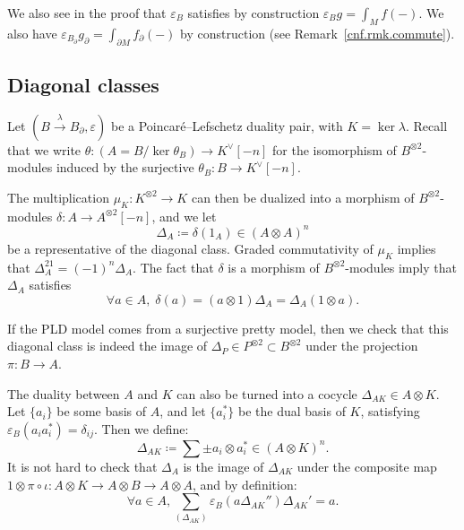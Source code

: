 We also see in the proof that $\varepsilon_{B}$ satisfies by construction $\varepsilon_{B} g = \int_{M} f(-)$.
We also have $\varepsilon_{B_{\partial}} g_{\partial} = \int_{\partial M} f_{\partial}(-)$ by construction (see Remark~\ref{cnf.rmk.commute}).

\subsection{Diagonal classes}
\label{cnfbnd.sec.diagonal-classes}

Let $(B \xrightarrow{\lambda} B_{\partial}, \varepsilon)$ be a Poincaré--Lefschetz duality pair, with $K = \ker \lambda$.
Recall that we write $\theta : (A = B / \ker \theta_{B}) \to K^{\vee}[-n]$ for the isomorphism of $B^{\otimes 2}$-modules induced by the surjective $\theta_{B} : B \to K^{\vee}[-n]$.

The multiplication $\mu_{K} : K^{\otimes 2} \to K$ can then be dualized into a morphism of $B^{\otimes 2}$-modules $\delta : A \to A^{\otimes 2}[-n]$, and we let
\begin{equation}
  \Delta_{A} \coloneqq \delta(1_{A}) \in (A \otimes A)^{n}
\end{equation}
be a representative of the diagonal class.
Graded commutativity of $\mu_{K}$ implies that $\Delta_{A}^{21} = (-1)^{n} \Delta_{A}$.
The fact that $\delta$ is a morphism of $B^{\otimes 2}$-modules imply that $\Delta_{A}$ satisfies
\begin{equation}
  \forall a \in A, \; \delta(a) = (a \otimes 1) \Delta_{A} = \Delta_{A} (1 \otimes a).
\end{equation}

\begin{remark}
  If the PLD model comes from a surjective pretty model, then we check that this diagonal class is indeed the image of $\Delta_{P} \in P^{\otimes 2} \subset B^{\otimes 2}$ under the projection $\pi : B \to A$.
\end{remark}

The duality between $A$ and $K$ can also be turned into a cocycle $\Delta_{AK} \in A \otimes K$.
Let $\{ a_{i} \}$ be some basis of $A$, and let $\{a_{i}^{*}\}$ be the dual basis of $K$, satisfying $\varepsilon_{B}(a_{i} a_{i}^{*}) = \delta_{ij}$.
Then we define:
\begin{equation}
  \label{cnfbnd.def.delta-ak}
  \Delta_{AK} \coloneqq \sum \pm a_{i} \otimes a_{i}^{*} \in (A \otimes K)^{n}.
\end{equation}
It is not hard to check that $\Delta_{A}$ is the image of $\Delta_{AK}$ under the composite map $1 \otimes \pi \circ \iota : A \otimes K \to A \otimes B \to A \otimes A$, and by definition:
\begin{equation}
  \forall a \in A, \sum_{(\Delta_{AK})} \varepsilon_{B}(a \Delta_{AK}'') \Delta_{AK}' = a.
\end{equation}

